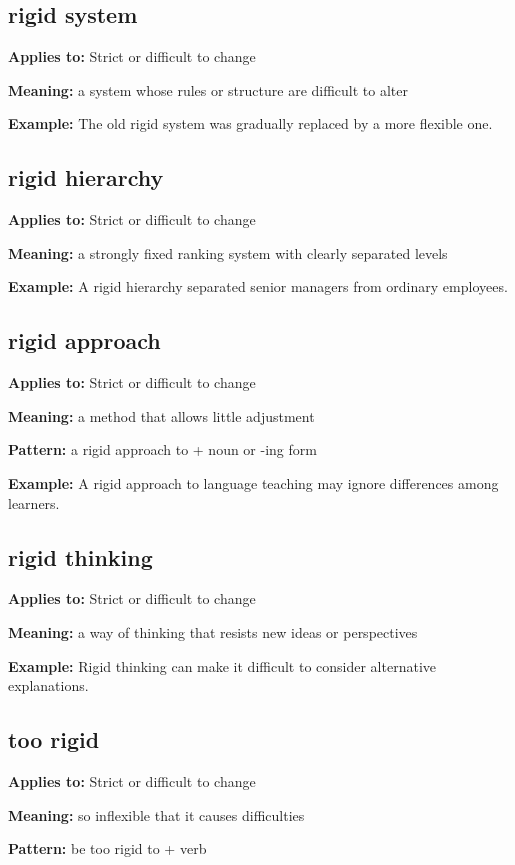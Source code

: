 \documentclass[11pt]{article}
\begin{document}
\subsection{rigid system}
\textbf{Applies to:} Strict or difficult to change

\textbf{Meaning:} a system whose rules or structure are difficult to alter

\textbf{Example:} The old rigid system was gradually replaced by a more flexible one.

\subsection{rigid hierarchy}
\textbf{Applies to:} Strict or difficult to change

\textbf{Meaning:} a strongly fixed ranking system with clearly separated levels

\textbf{Example:} A rigid hierarchy separated senior managers from ordinary employees.

\subsection{rigid approach}
\textbf{Applies to:} Strict or difficult to change

\textbf{Meaning:} a method that allows little adjustment

\textbf{Pattern:} a rigid approach to + noun or -ing form

\textbf{Example:} A rigid approach to language teaching may ignore differences among learners.

\subsection{rigid thinking}
\textbf{Applies to:} Strict or difficult to change

\textbf{Meaning:} a way of thinking that resists new ideas or perspectives

\textbf{Example:} Rigid thinking can make it difficult to consider alternative explanations.

\subsection{too rigid}
\textbf{Applies to:} Strict or difficult to change

\textbf{Meaning:} so inflexible that it causes difficulties

\textbf{Pattern:} be too rigid to + verb
\end{document}
